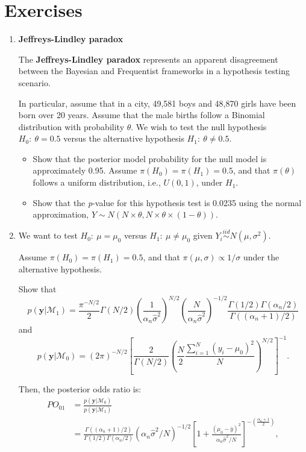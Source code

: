\section{Exercises}\label{sec28}
\begin{enumerate}
	\item \textbf{Jeffreys-Lindley paradox}
	
	The \textbf{Jeffreys-Lindley paradox} \cite{Jeffreys1961,lindley1957statistical} represents an apparent disagreement between the Bayesian and Frequentist frameworks in a hypothesis testing scenario.
	
	In particular, assume that in a city, 49,581 boys and 48,870 girls have been born over 20 years. Assume that the male births follow a Binomial distribution with probability $\theta$. We wish to test the null hypothesis $H_0: \ \theta = 0.5$ versus the alternative hypothesis $H_1: \ \theta \neq 0.5$.
	
	\begin{itemize}
		\item Show that the posterior model probability for the null model is approximately 0.95. Assume $\pi(H_0) = \pi(H_1) = 0.5$, and that $\pi(\theta)$ follows a uniform distribution, i.e., ${U}(0,1)$, under $H_1$.
		\item Show that the \textit{p}-value for this hypothesis test is 0.0235 using the normal approximation, $Y \sim N(N \times \theta, N \times \theta \times (1 - \theta))$.
	\end{itemize}
	
	\item We want to test $H_0: \ \mu = \mu_0$ versus $H_1: \ \mu \neq \mu_0$ given $Y_i \stackrel{iid}{\sim} N(\mu, \sigma^2)$.
	
	Assume $\pi(H_0) = \pi(H_1) = 0.5$, and that $\pi(\mu, \sigma) \propto 1/\sigma$ under the alternative hypothesis.
	
	Show that	
	\[
	p(\mathbf{y}|\mathcal{M}_1) = \frac{\pi^{-N/2}}{2} \Gamma(N/2) \left( \frac{1}{\alpha_n \hat{\sigma}^2} \right)^{N/2} \left( \frac{N}{\alpha_n \hat{\sigma}^2} \right)^{-1/2} \frac{\Gamma(1/2) \Gamma(\alpha_n/2)}{\Gamma((\alpha_n+1)/2)}
	\]
	and 
	\[
	p(\mathbf{y}|\mathcal{M}_0) = (2\pi)^{-N/2} \left[ \frac{2}{\Gamma(N/2)} \left( \frac{N}{2} \frac{\sum_{i=1}^N (y_i - \mu_0)^2}{N} \right)^{N/2} \right]^{-1}.
	\]
	
	Then, the posterior odds ratio is:	
	\begin{align*}
		PO_{01} &= \frac{p(\mathbf{y}|\mathcal{M}_0)}{p(\mathbf{y}|\mathcal{M}_1)} \\
		&= \frac{\Gamma((\alpha_n+1)/2)}{\Gamma(1/2)\Gamma(\alpha_n/2)} (\alpha_n \hat{\sigma}^2 / N)^{-1/2} \left[ 1 + \frac{(\mu_0 - \bar{y})^2}{\alpha_n \hat{\sigma}^2 / N} \right]^{-\left(\frac{\alpha_n + 1}{2}\right)},
	\end{align*}
	

\end{enumerate}
